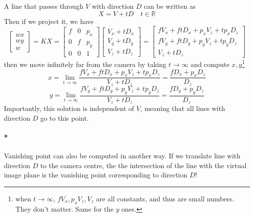 \documentclass[11pt]{article}
\newcommand{\real}{\mathbb{R}}
\begin{document}
A line that passes through $V$ with direction $D$ can be written as
\begin{equation}
	X = V + tD\quad t \in\real
\end{equation}
Then if we project it, we have
\begin{equation}
	\left[\begin{array}{c}
			w x \\
			w y \\
			w
		\end{array}\right]=K X=\left[\begin{array}{ccc}
			f & 0 & p_{x} \\
			0 & f & p_{y} \\
			0 & 0 & 1
		\end{array}\right]\left[\begin{array}{c}
			V_{x}+t D_{x} \\
			V_{y}+t D_{y} \\
			V_{z}+t D_{z}
		\end{array}\right]=\left[\begin{array}{c}
			f V_{x}+f t D_{x}+p_{x} V_{z}+t p_{x} D_{z} \\
			f V_{y}+f t D_{y}+p_{y} V_{z}+t p_{y} D_{z} \\
			V_{z}+t D_{z}
	\end{array}\right]
\end{equation}
then we move infinitely far from the camera by taking $t \rightarrow \infty$ and compute $x, y$\footnote{when $t \rightarrow \infty$, $fV_x, p_xV_z, V_z$ are all constants, and thus are small numbers. They don't matter. Same for the $y$ ones. }
\begin{equation}
	x=\lim _{t \rightarrow \infty} \frac{f V_{x}+f t D_{x}+p_{x} V_{z}+t p_{x} D_{z}}{V_{z}+t D_{z}}=\frac{f D_{x}+p_{x} D_{z}}{D_{z}}
\end{equation}
\begin{equation}
	y=\lim _{t \rightarrow \infty} \frac{f V_{y}+f t D_{y}+p_{y} V_{z}+t p_{y} D_{z}}{V_{z}+t D_{z}}=\frac{f D_{y}+p_{y} D_{z}}{D_{z}}
\end{equation}
Importantly, this solution is independent of $V$, meaning that all lines with direction $D$ go to this point. 

\paragraph{*} Vanishing point can also be computed in another way. If we translate line with direction $D$ to the camera centre, the the intersection of the line with the virtual image plane is the vanishing point corresponding to direction $D$!
\end{document}
